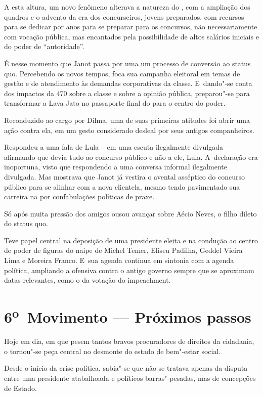 A esta altura, um novo fenômeno alterava a natureza do , com a
ampliação dos quadros e o advento da era dos concurseiros, jovens
preparados, com recursos para se dedicar por anos para se preparar para
os concursos, não necessariamente com vocação pública, mas encantados
pela possibilidade de altos salários iniciais e do poder de
``autoridade''.

É nesse momento que Janot passa por uma um processo de conversão ao
status quo. Percebendo os novos tempos, foca sua campanha eleitoral em
temas de gestão e de atendimento às demandas corporativas da classe. E~dando"-se conta dos impactos da  470 sobre a classe e sobre a opinião
pública, preparou"-se para transformar a Lava Jato no passaporte final do
 para o centro do poder.

Reconduzido ao cargo por Dilma, uma de suas primeiras atitudes foi abrir
uma ação contra ela, em um gesto considerado desleal por seus antigos
companheiros.

Respondeu a uma fala de Lula -- em uma escuta ilegalmente divulgada --
afirmando que devia tudo ao concurso público e não a ele, Lula. A~declaração era inoportuna, visto que respondendo a uma conversa informal
ilegalmente divulgada. Mas mostrava que Janot já vestira o avental
asséptico do concurso público para se alinhar com a nova clientela,
mesmo tendo pavimentado sua carreira na  por confabulações políticas
de praxe.

Só após muita pressão dos amigos ousou avançar sobre Aécio Neves, o
filho dileto do status quo.

Teve papel central na deposição de uma presidente eleita e na condução
ao centro de poder de figuras do naipe de Michel Temer, Eliseu Padilha,
Geddel Vieira Lima e Moreira Franco. E~sua agenda continua em sintonia
com a agenda política, ampliando a ofensiva contra o antigo governo
sempre que se aproximam datas relevantes, como o da votação do
impeachment.

\section{6\textsuperscript{o}~Movimento --- Próximos passos}

Hoje em dia, em que pesem tantos bravos procuradores de direitos da
cidadania, o  tornou"-se peça central no desmonte do estado de
bem"-estar social.

Desde o início da crise política, sabia"-se que não se tratava apenas da
disputa entre uma presidente atabalhoada e políticos barras"-pesadas, mas
de concepções de Estado.

